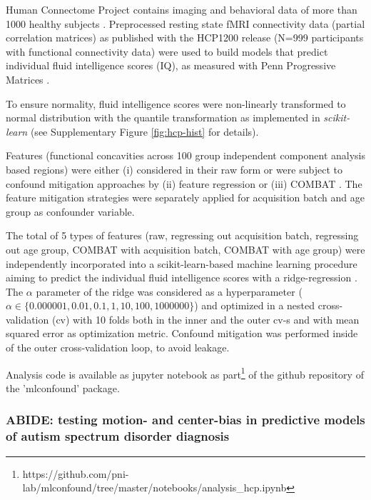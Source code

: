 \documentclass{article}
\begin{document}
Human Connectome Project contains imaging and behavioral data of more than 1000 healthy subjects \citep{van2013wu}. Preprocessed resting state fMRI connectivity data (partial correlation matrices) \citep{glasser2013minimal} as published with the HCP1200 release (N=999 participants with functional connectivity data) were used to build models that predict individual fluid intelligence scores (IQ), as measured with Penn Progressive Matrices \citep{duncan2000neural}.

To ensure normality, fluid intelligence scores were non-linearly transformed to normal distribution with the quantile transformation \citep{beasley2009rank} as implemented in \emph{scikit-learn} \citep{pedregosa2011scikit} (see Supplementary Figure \ref{fig:hcp-hist} for details).

Features (functional concavities across 100 group independent component analysis based regions) were either (i) considered in their raw form or were subject to confound mitigation approaches by (ii) feature regression \citep{rao2017predictive} or (iii) COMBAT \citep{johnson2007adjusting, fortin2018harmonization}.
The feature mitigation strategies were separately applied for acquisition batch and age group as confounder variable.

The total of 5 types of features (raw, regressing out acquisition batch, regressing out age group, COMBAT with acquisition batch, COMBAT with age group) were independently incorporated into a scikit-learn-based \citep{pedregosa2011scikit} machine learning procedure aiming to predict the individual fluid intelligence scores with a ridge-regression \citep{hoerl1970ridge}. The $\alpha$ parameter of the ridge was considered as a hyperparameter ($\alpha \in \{0.000001, 0.01, 0.1, 1, 10, 100, 1000000\}$) and optimized in a nested cross-validation (cv) with 10 folds both in the inner and the outer cv-s and with mean squared error as optimization metric. Confound mitigation was performed inside of the outer cross-validation loop, to avoid leakage.

Analysis code is available as jupyter notebook as part\footnote{https://github.com/pni-lab/mlconfound/tree/master/notebooks/analysis\_hcp.ipynb} of the github repository of the 'mlconfound' package.


\subsubsection*{ABIDE: testing motion- and center-bias in predictive models of autism spectrum disorder diagnosis}
\end{document}
